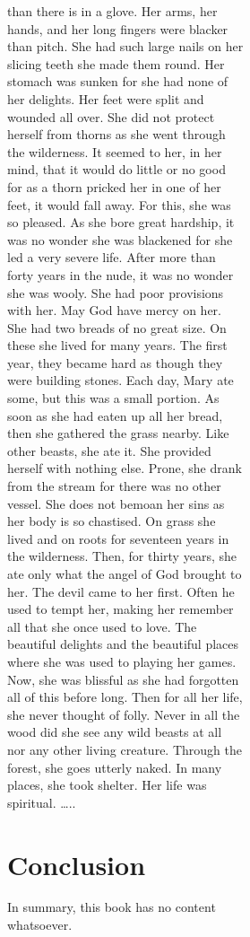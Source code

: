 \documentclass[
  letterpaper,
  DIV=11,
  numbers=noendperiod,
  oneside]{scrreprt}
\begin{document}
\begin{figure}
\begin{figure}
\begin{figure}
\begin{minipage}{0.20\linewidth}
than there is in a glove. Her arms, her hands, and her long fingers were
{blacker than pitch.} She had such large nails {on her slicing teeth she
made them round.} Her stomach was sunken {for she had {none} of her
delights.} Her feet were split and wounded all over. She {did not}
protect herself from thorns as she went through the wilderness. It
seemed to her, in her mind, that it would do {little or no good} {for as
a thorn pricked her} {in one of her feet, it would fall away.} For this,
she was so pleased. As she bore great hardship, {it was no wonder} she
was {blackened} for she led a very severe life. After more than forty
years in the nude, {it was no wonder} she was wooly. She had poor
provisions with her. May {God} have mercy on her. She had two breads of
{no great size}. On these she lived for many years. The first year, they
became hard as though they were building stones. Each day, Mary ate
some, but this was a small portion. As soon as she had eaten up all her
bread, then she gathered the grass nearby. Like other beasts, she ate
it. She provided herself with {nothing else}. Prone, she drank from the
stream for there was {no} other vessel. She {does not} bemoan her sins
as her body is so chastised. On grass she lived and on roots for
seventeen years in the wilderness. Then, for thirty years, she ate
{only} what the angel of God brought to her. The devil came to her
first. Often he used to tempt her, making her remember all that she once
used to love. The beautiful delights and the beautiful places where she
was used to playing her games. Now, she was blissful as she had
forgotten all of this before long. Then for all her life, she {never}
thought of folly. {Never} in all the wood did she see {any} wild beasts
{at all} {nor any} other living creature. Through the forest, she goes
{utterly naked.} In many places, she took shelter. Her life was
spiritual. \ldots..

\end{minipage}%
\newline
\begin{minipage}{0.20\linewidth}


\chapter{Conclusion}\label{conclusion}

In summary, this book has no content whatsoever.



\end{minipage}
\end{figure}
\end{figure}
\end{figure}
\end{document}
